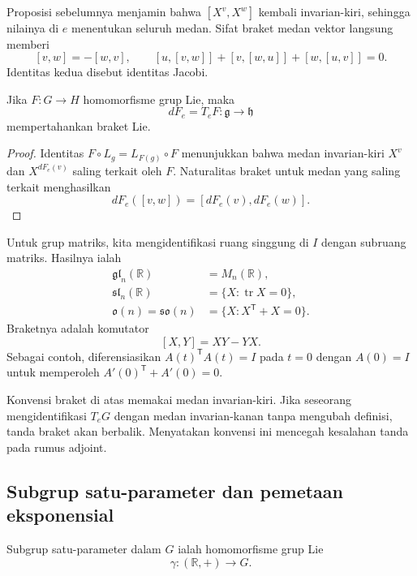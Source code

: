 Proposisi sebelumnya menjamin bahwa $[X^v,X^w]$ kembali invarian-kiri,
sehingga nilainya di $e$ menentukan seluruh medan. Sifat braket medan vektor
langsung memberi
\[
 [v,w]=-[w,v],
 \qquad
 [u,[v,w]]+[v,[w,u]]+[w,[u,v]]=0.
\]
Identitas kedua disebut identitas Jacobi.

\begin{Proposition}\label{o011-bl-prop-homomorphism-differential}
Jika $F\colon G\to H$ homomorfisme grup Lie, maka
\[
  dF_e=T_eF\colon\mathfrak g\longrightarrow\mathfrak h
\]
mempertahankan braket Lie.
\end{Proposition}

\begin{proof}
Identitas $F\circ L_g=L_{F(g)}\circ F$ menunjukkan bahwa medan
invarian-kiri $X^v$ dan $X^{dF_e(v)}$ saling terkait oleh $F$. Naturalitas
braket untuk medan yang saling terkait menghasilkan
\[
  dF_e([v,w])=[dF_e(v),dF_e(w)].
\]
\end{proof}

\begin{beispiel}\label{o011-bl-ex-matrix-algebras}
Untuk grup matriks, kita mengidentifikasi ruang singgung di $I$ dengan
subruang matriks. Hasilnya ialah
\[
\begin{aligned}
 \mathfrak{gl}_n(\mathbb R)&=M_n(\mathbb R),\\
 \mathfrak{sl}_n(\mathbb R)&=\{X:\operatorname{tr}X=0\},\\
 \mathfrak o(n)=\mathfrak{so}(n)&=\{X:X^{\mathsf T}+X=0\}.
\end{aligned}
\]
Braketnya adalah komutator
\[
  [X,Y]=XY-YX.
\]
Sebagai contoh, diferensiasikan $A(t)^{\mathsf T}A(t)=I$ pada $t=0$ dengan
$A(0)=I$ untuk memperoleh $A'(0)^{\mathsf T}+A'(0)=0$.
\end{beispiel}

\begin{bemerkung}\label{o011-bl-rem-sign}
Konvensi braket di atas memakai medan invarian-kiri. Jika seseorang
mengidentifikasi $T_eG$ dengan medan invarian-kanan tanpa mengubah definisi,
tanda braket akan berbalik. Menyatakan konvensi ini mencegah kesalahan tanda
pada rumus adjoint.
\end{bemerkung}

\subsection{Subgrup satu-parameter dan pemetaan eksponensial}

\begin{definition}\label{o011-bl-def-one-parameter}
Subgrup satu-parameter dalam $G$ ialah homomorfisme grup Lie
\[
  \gamma\colon(\mathbb R,+)\longrightarrow G.
\]
\end{definition}

